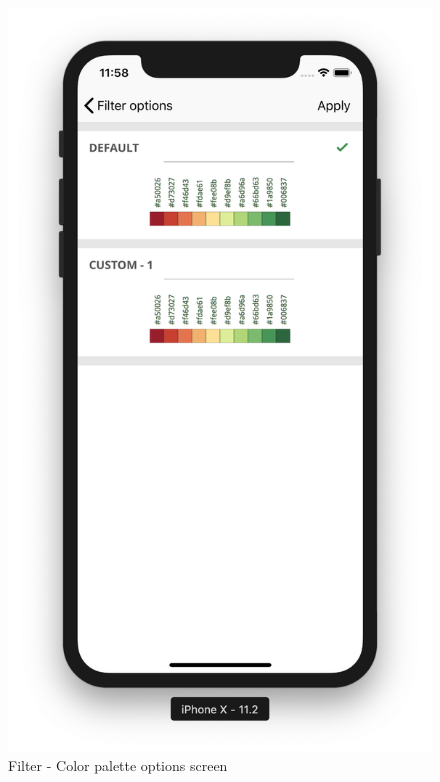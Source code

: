 \begin{itemize}
\begin{itemize}
        \begin{figure}[H]
            \centering
            \includegraphics[width=0.5\linewidth]{figures/ch2/color_scheme.png}
            \caption{\label{fig:level_list_screen} Filter - Color palette  options screen}
        \end{figure}
        
    \end{itemize}

\end{itemize}




